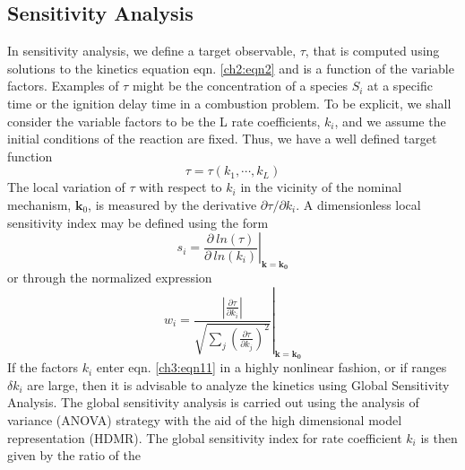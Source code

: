 \subsection{Sensitivity Analysis}
In sensitivity analysis, we define a
target observable, $\tau$, that is computed using solutions to the
kinetics equation eqn. \ref{ch2:eqn2} and is a function of the variable factors.
Examples of $\tau$ might be the concentration of a species $S_i$ at a
specific time or the ignition delay time in a combustion
problem. To be explicit, we shall consider the variable factors to
be the L rate coefficients, $k_i$, and we assume the initial
conditions of the reaction are fixed. Thus, we have a well defined
target function
\begin{equation}
\label{ch3:eqn11}
\tau = \tau(k_1, \cdots, k_L)
\end{equation}
The local variation of $\tau$ with respect to $k_i$ in the vicinity of the
nominal mechanism, $\mathbf{k}_0$, is measured by the derivative ${\partial \tau}/{\partial k_i}$. A
dimensionless local sensitivity index may be defined using the form
\begin{equation}
\label{ch3:eqn12}
s_i = \left. \frac{\partial ~ ln(\tau)}{\partial ~ ln(k_i)} \right\vert_{\mathbf{k}=\mathbf{k_0}}
\end{equation}
or through the normalized expression
\begin{equation}
\label{ch3:eqn13}
w_i = \left. \frac{ \left\vert \frac{\partial \tau}{\partial k_i} \right\vert }{\sqrt{\sum_j{\left(  \frac{\partial \tau}{\partial k_j} \right)^2 }}} \right\vert_{\mathbf{k}=\mathbf{k_0}}
\end{equation}
If the factors $k_i$ enter eqn. \ref{ch3:eqn11} in a highly nonlinear fashion, or
if ranges $\delta k_i$ are large, then it is advisable to analyze the kinetics using Global Sensitivity Analysis.\cite{ch3_4_najm2009uncertainty,ch3_26_cukier1973study,ch3_27_cukier1975study,
ch3_28_mcrae1982global,ch3_29_zador2005local,ch3_30_zador2005local,ch3_31_wang2015combustion,
ch3_32_saltelli2008global,ch3_33_scire2001comparison} The global sensitivity
analysis is carried out using the analysis of variance
(ANOVA)\cite{ch3_34_sobol2001global} strategy with the aid of the high dimensional
model representation (HDMR).\cite{ch3_35_rabitz1999general,ch3_36_li2001high,ch3_37_li2002practical,ch3_38_ziehn2008global,
ch3_39_ziehn2009gui,ch3_40_ziehn2009global,ch3_41_skodje2010theoretical,ch3_42_klippenstein2011uncertainty,
ch3_43_davis2011global,ch3_44_zhou2013multitarget} The global sensitivity
index for rate coefficient $k_i$ is then given by the ratio of the

